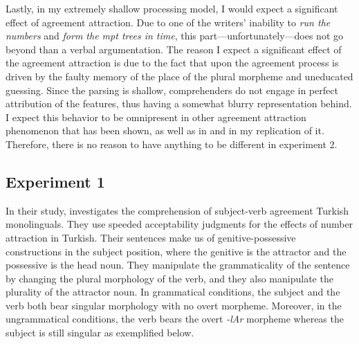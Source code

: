 \documentclass[doc]{apa6}
\begin{document}
Lastly, in my extremely shallow processing model, I would expect a significant effect of agreement attraction. Due to one of the writers' inability to \emph{run the numbers} and \emph{form the mpt trees in time}, this part---unfortunately---does not go beyond than a verbal argumentation. The reason I expect a significant effect of the agreement attraction is due to the fact that upon the agreement process is driven by the faulty memory of the place of the plural morpheme and uneducated guessing. Since the parsing is shallow, comprehenders do not engage in perfect attribution of the features, thus having a somewhat blurry representation behind. I expect this behavior to be omnipresent in other agreement attraction phenomenon that has been shown, as well as in \textcite{Lago2018} and in my replication of it. Therefore, there is no reason to have anything to be different in experiment 2.

\hypertarget{experiment-1}{%
\subsection{Experiment 1}\label{experiment-1}}

In their study, \textcite{Lago2018} investigates the comprehension of subject-verb agreement Turkish monolinguals. They use speeded acceptability judgments for the effects of number attraction in Turkish. Their sentences make us of genitive-possessive constructions in the subject position, where the genitive is the attractor and the possessive is the head noun. They manipulate the grammaticality of the sentence by changing the plural morphology of the verb, and they also manipulate the plurality of the attractor noun. In grammatical conditions, the subject and the verb both bear singular morphology with no overt morpheme. Moreover, in the ungrammatical conditions, the verb bears the overt \emph{-lAr} morpheme whereas the subject is still singular as exemplified below.
\end{document}
